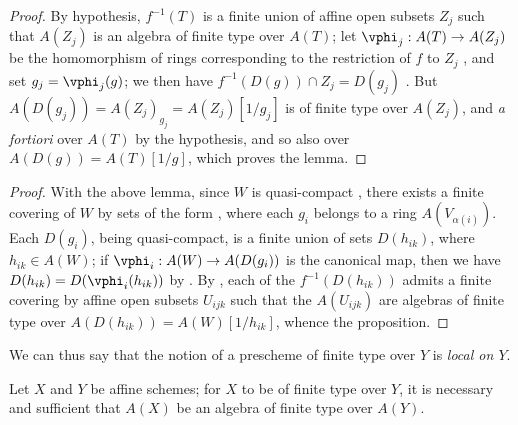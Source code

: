\begin{proof}
By hypothesis, $f^{-1}(T)$ is a finite union of affine open subsets $Z_j$ such that $A(Z_j)$ is an algebra of finite type over $A(T)$;
let $\vphi_j:A(T)\to A(Z_j)$ be the homomorphism of rings corresponding to the restriction of $f$ to $Z_j$ , and set $g_j=\vphi_j(g)$;
we then have $f^{-1}(D(g))\cap Z_j=D(g_j)$ .
But $A(D(g_j))=A(Z_j)_{g_j}=A(Z_j)[1/g_j]$ is of finite type over $A(Z_j)$, and \emph{a fortiori} over $A(T)$ by the hypothesis, and so also over $A(D(g))=A(T)[1/g]$, which proves the lemma.
\end{proof}

\begin{proof}
With the above lemma, since $W$ is quasi-compact , there exists a finite covering of $W$ by sets of the form , where each $g_i$ belongs to a ring $A(V_{\alpha(i)})$.
Each $D(g_i)$, being quasi-compact, is a finite union of sets $D(h_{ik})$, where $h_{ik}\in A(W)$;
if $\vphi_i:A(W)\to A(D(g_i))$ is the canonical map, then we have $D(h_{ik})=D(\vphi_i(h_{ik}))$ by .
By , each of the $f^{-1}(D(h_{ik}))$ admits a finite covering by affine open subsets $U_{ijk}$ such that the $A(U_{ijk})$ are algebras of finite type over $A(D(h_{ik}))=A(W)[1/h_{ik}]$, whence the proposition.
\end{proof}

We
can thus say that the notion of a prescheme of finite type over $Y$ is \emph{local on $Y$}.

\begin{proposition}[6.3.3]
\label{I.6.3.3}
Let $X$ and $Y$ be affine schemes;
for $X$ to be of finite type over $Y$, it is necessary and sufficient that $A(X)$ be an algebra of finite type over $A(Y)$.
\end{proposition}

